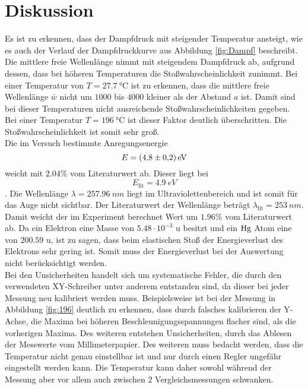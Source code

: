 \section{Diskussion}
\label{sec:Diskussion}

Es ist zu erkennen, dass der Dampfdruck mit steigender Temperatur ansteigt, wie es auch der Verlauf der Dampfdruckkurve aus Abbildung \ref{fig:Dampf} beschreibt.
Die mittlere freie Wellenlänge nimmt mit steigendem Dampfdruck ab, aufgrund dessen, dass bei höheren Temperaturen
die Stoßwahrscheinlichkeit zunimmt.
Bei einer Temperatur von $T = \qty{27.7}{\degreeCelsius}$ ist zu erkennen, dass die mittlere freie Wellenlänge $\bar{w}$
nicht um $1000$ bis $4000$ kleiner als der Abstand $a$ ist.
Damit sind bei dieser Temperaturen nicht ausreichende Stoßwahrscheinlichkeiten gegeben.
Bei einer Temperatur $T = \qty{196}{\degreeCelsius}$ ist dieser Faktor deutlich überschritten.
Die Stoßwahrscheinlichkeit ist somit sehr groß.\\


\noindent Die im Versuch bestimmte Anregungsenergie 
\begin{equation*}
    E = \qty{4.8 \pm 0.2}{eV}
\end{equation*}
weicht mit $2.04 \%$ vom Literaturwert ab.
Dieser liegt bei 
\begin{equation*}
    E_\text{lit} = \qty{4.9}{eV}
\end{equation*}
\cite{EAnregung}.
Die Wellenlänge $\lambda = \qty{257.96}{nm}$ liegt im Ultraviolettenbereich und ist somit für das Auge nicht sichtbar.
Der Literaturwert der Wellenlänge beträgt $\lambda_\text{lit} = \qty{253}{nm}$.
Damit weicht der im Experiment berechnet Wert um $1.96 \%$ vom Literaturwert ab.
Da ein Elektron eine Masse von $5.48 \cdot 10^{-3}$ u besitzt und ein $\ce{Hg}$ Atom eine von $200.59$ u,
ist zu sagen, dass beim elastischen Stoß der Energieverlust des Elektrons sehr gering ist.
Somit muss der Energieverlust bei der Auswertung nicht berücksichtigt werden.\\

\noindent Bei den Unsicherheiten handelt sich um systematische Fehler, die durch den verwendeten XY-Schreiber unter anderem
entstanden sind, da dieser bei jeder Messung neu kalibriert werden muss.
Beispielsweise ist bei der Messung in Abbildung \ref{fig:196} deutlich zu erkennen, dass durch falsches kalibrieren der Y-Achse,
die Maxima bei höheren Beschleunigungsspannungen flacher sind, als die vorherigen Maxima.
Des weiteren entstehen Unsicherheiten, durch das Ablesen der Messwerte vom Millimeterpapier.
Des weiteren muss bedacht werden, dass die Temperatur nicht genau einstellbar ist und nur durch einen Regler ungefähr eingestellt werden kann.
Die Temperatur kann daher sowohl während der Messung aber vor allem auch zwischen 2 Vergleichsmessungen schwanken.






